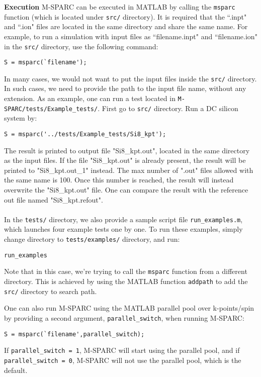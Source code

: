 \documentclass[xcolor=dvipsnames,t]{beamer}
\begin{document}
\begin{frame}{\textbf{Execution}} \label{Execution}
M-SPARC can be executed in MATLAB by calling the \texttt{msparc} function (which is located under \texttt{src/} directory). It is required that the ``.inpt" and ``.ion" files are located in the same directory and share the same name. For example, to run a simulation with input files as ``filename.inpt" and ``filename.ion" in the \texttt{src/} directory, use the following command:
\begin{verbatim}
S = msparc(`filename');
\end{verbatim} 

In many cases, we would not want to put the input files inside the \texttt{src/} directory. In such cases, we need to provide the path to the input file name, without any extension. As an example, one can run a test located in \texttt{M-SPARC/tests/Example\_tests/}. First go to \texttt{src/} directory. Run a DC silicon system  by:
\begin{verbatim}
S = msparc('../tests/Example_tests/Si8_kpt');
\end{verbatim} 
The result is printed to output file "Si8\_kpt.out", located in the same directory as the input files. If the file "Si8\_kpt.out" is already present, the result will be printed to "Si8\_kpt.out\_1" instead. The max number of ".out" files allowed with the same name is 100. Once this number is reached, the result will instead overwrite the "Si8\_kpt.out" file. One can compare the result with the reference out file named "Si8\_kpt.refout".\\~\\

In the \texttt{tests/} directory, we also provide a sample script file \texttt{run\_examples.m}, which launches four example tests one by one. To run these examples, simply change directory to \texttt{tests/examples/} directory, and run: 
\begin{verbatim}
run_examples
\end{verbatim} 
Note that in this case, we're trying to call the \texttt{msparc} function from a different directory. This is achieved by using the MATLAB function \texttt{addpath} to add the \texttt{src/} directory to search path.

One can also run M-SPARC using the MATLAB parallel pool over k-points/spin by providing a second argument, \texttt{parallel\_switch}, when running M-SPARC:
\begin{verbatim}
S = msparc(`filename',parallel_switch);
\end{verbatim} 
If \texttt{parallel\_switch = 1}, M-SPARC will start using the parallel pool, and if \texttt{parallel\_switch = 0}, M-SPARC will not use the parallel pool, which is the default.



\end{frame}
\end{document}
